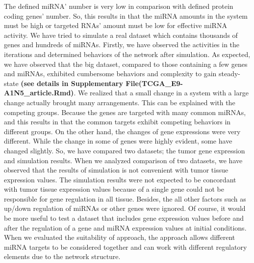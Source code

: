 \documentclass[]{article}
\begin{document}
The defined miRNA' number is very low in comparison with defined protein
coding genes' number. So, this results in that the miRNA amounts in the
system must be high or targeted RNAs' amount must be low for effective
miRNA activity. We have tried to simulate a real dataset which contains
thousands of genes and hundreds of miRNAs. Firstly, we have observed the
activities in the iterations and determined behaviors of the network
after simulation. As expected, we have observed that the big dataset,
compared to those containing a few genes and miRNAs, exhibited
cumbersome behaviors and complexity to gain steady-state \textbf{(see
details in Supplementary File(TCGA\_E9-A1N5\_article.Rmd)}. We realized
that a small change in a system with a large change actually brought
many arrangements. This can be explained with the competing groups.
Because the genes are targeted with many common miRNAs, and this results
in that the common targets exhibit competing behaviors in different
groups. On the other hand, the changes of gene expressions were very
different. While the change in some of genes were highly evident, some
have changed slightly. So, we have compared two datasets; the tumor gene
expression and simulation results. When we analyzed comparison of two
datasets, we have observed that the results of simulation is not
convenient with tumor tissue expression values. The simulation results
were not expected to be concordant with tumor tissue expression values
because of a single gene could not be responsible for gene regulation in
all tissue. Besides, the all other factors such as up/down regulation of
miRNAs or other genes were ignored. Of course, it would be more useful
to test a dataset that includes gene expression values before and after
the regulation of a gene and miRNA expression values at initial
conditions. When we evaluated the suitability of approach, the approach
allows different miRNA targets to be considered together and can work
with different regulatory elements due to the network structure.
\end{document}
